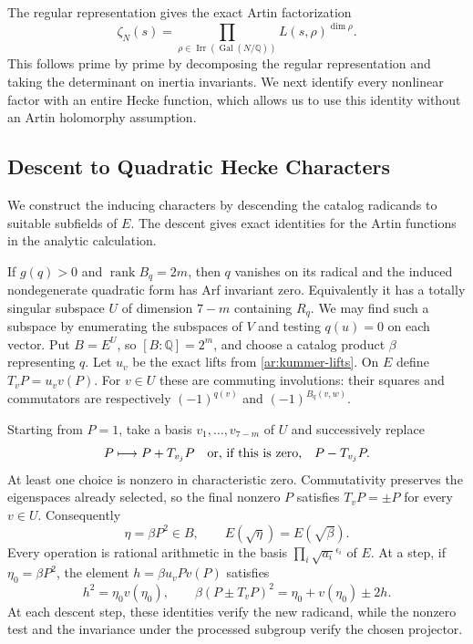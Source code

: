 The regular representation gives the exact Artin factorization
\begin{equation}\label{ar:artin-factorization}
 \zeta_N(s)=\prod_{\rho\in\operatorname{Irr}(\operatorname{Gal}(N/\mathbb Q))}
                     L(s,\rho)^{\dim\rho}.
\end{equation}
This follows prime by prime by decomposing the regular representation
and taking the determinant on inertia invariants. We next identify every
nonlinear factor with an entire Hecke function,
which allows us to use this identity without an Artin holomorphy
assumption.

\subsection{Descent to Quadratic Hecke Characters}\label{ar:descent}
We construct the inducing characters by descending the catalog radicands
to suitable subfields of $E$. The descent gives exact identities for the
Artin functions in the analytic calculation.

If $g(q)>0$ and $\operatorname{rank}B_q=2m$, then $q$ vanishes on its
radical and the induced nondegenerate quadratic form has Arf invariant
zero. Equivalently it has a totally singular subspace $U$ of dimension
$7-m$ containing $R_q$. We may find such a subspace by enumerating the subspaces of $V$ and
testing $q(u)=0$ on each vector. Put $B=E^U$, so
$[B:\mathbb Q]=2^m$, and choose a catalog product $\beta$ representing $q$.
Let $u_v$ be the exact lifts from \eqref{ar:kummer-lifts}. On $E$ define
$T_vP=u_vv(P)$. For $v\in U$ these are commuting involutions: their
squares and commutators are respectively $(-1)^{q(v)}$ and
$(-1)^{B_q(v,w)}$.

Starting from $P=1$, take a basis $v_1,\ldots,v_{7-m}$ of $U$ and
successively replace
\begin{equation}\label{ar:projectors}
 P\longmapsto P+T_{v_j}P
 \quad\hbox{or, if this is zero,}\quad P-T_{v_j}P.
\end{equation}
At least one choice is nonzero in characteristic zero. Commutativity
preserves the eigenspaces already selected, so the final nonzero $P$
satisfies $T_vP=\pm P$ for every $v\in U$. Consequently
\[
 \eta=\beta P^2\in B,
 \qquad E(\sqrt\eta)=E(\sqrt\beta).
\]
Every operation is rational arithmetic in the basis
$\prod_i\sqrt{a_i}^{\epsilon_i}$ of $E$. At a step, if
$\eta_0=\beta P^2$, the element
$h=\beta u_vP v(P)$ satisfies
\[
 h^2=\eta_0v(\eta_0),\qquad
 \beta(P\pm T_vP)^2=\eta_0+v(\eta_0)\pm2h.
\]
At each descent step, these identities verify the new radicand, while
the nonzero test and the invariance under the processed subgroup verify
the chosen projector.

